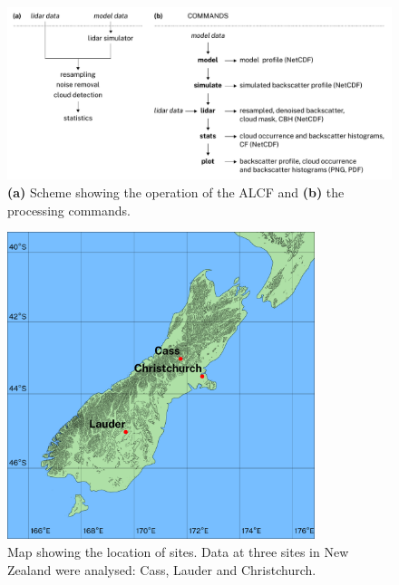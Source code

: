 \begin{figure}[t]
\centering
\includegraphics[width=\textwidth]{chapter3/fig/scheme.pdf}
\caption[Scheme showing the operation of the ALCF and the processing commands]{\textbf{(a)} Scheme showing the operation of the ALCF and \textbf{(b)} the processing commands.}
\label{fig:scheme}
\end{figure}

\clearpage

\begin{figure}[t]
\centering
\includegraphics[width=0.8\textwidth]{chapter3/fig/map.png}
\caption[Map showing the location of sites]{Map showing the location of sites. Data at three sites in New Zealand
were analysed: Cass, Lauder and Christchurch.}
\label{fig:map}
\end{figure}

\clearpage

